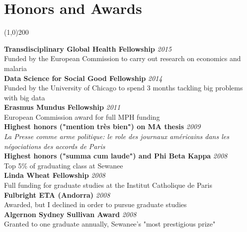 \documentclass[11pt]{article}
\begin{document}
{{\newpage




\section*{Honors and Awards} %
\vspace{-7mm}
\line(1,0){200}
\vspace{2mm}

\noindent \textbf{Transdisciplinary Global Health Fellowship} \hfill \emph{2015}\\
\noindent Funded by the European Commission to carry out research on economics and malaria \\


\noindent \textbf{Data Science for Social Good Fellowship} \hfill \emph{2014}\\
\noindent Funded by the University of Chicago to spend 3 months tackling big problems with big data \\

\noindent \textbf{Erasmus Mundus Fellowship} \hfill \emph{2011}\\
\noindent European Commission award for full MPH funding \\

\noindent \textbf{Highest honors ("mention très bien") on MA thesis} \hfill \emph{2009}\\
\noindent \textit{La Presse comme arme politique: le role des journaux américains dans les négociations des accords de Paris}\\

\noindent \textbf{Highest honors ("summa cum laude") and Phi Beta Kappa}  \hfill \emph{2008}\\
\noindent Top 5\% of graduating class at Sewanee  \\

\noindent \textbf{Linda Wheat Fellowship}  \hfill \emph{2008}\\
\noindent Full funding for graduate studies at the Institut Catholique de Paris  \\

\noindent \textbf{Fulbright ETA (Andorra)}  \hfill \emph{2008}\\
\noindent Awarded, but I declined in order to pursue graduate studies \\

\noindent \textbf{Algernon Sydney Sullivan Award}  \hfill \emph{2008}\\
\noindent Granted to one graduate annually, Sewanee's "most prestigious prize" \\

}}
\end{document}
